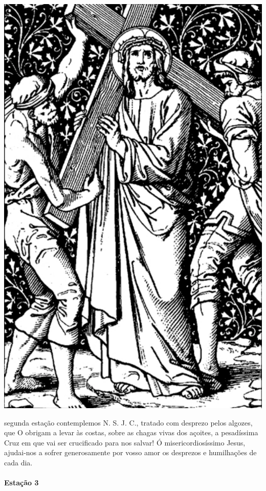 \begin{nscenter}
\includegraphics[width=.8\textwidth, height=.8\textheight, keepaspectratio]{media/station2}
\end{nscenter}

 segunda estação contemplemos N. S. J. C., tratado com desprezo pelos algozes, que O obrigam a levar às costas, sobre as chagas vivas dos açoites, a pesadíssima Cruz em que vai ser crucificado para nos salvar!
Ó misericordiosíssimo Jesus, ajudai-nos a sofrer generosamente por vosso amor os desprezos e humilhações de cada dia.

\newpage

\paragraph{Estação 3}

